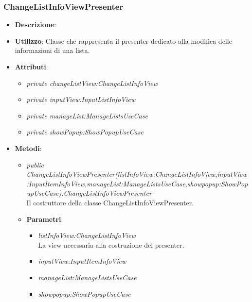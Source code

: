 \subsubsection{ChangeListInfoViewPresenter}
\begin{itemize}
\item \textbf{Descrizione}: 
\item \textbf{Utilizzo}: Classe che rappresenta il presenter dedicato alla modifica delle informazioni di una lista.
\item \textbf{Attributi}:
	\begin{itemize}
	\item \textit{private changeListView:ChangeListInfoView}\\
	
	\item \textit{private inputView:InputListInfoView}\\
	
	\item \textit{private manageList:ManageListsUseCase}\\
	
	\item \textit{private showPopup:ShowPopupUseCase}\\
	
	\end{itemize} 
\item \textbf{Metodi}:
	\begin{itemize}
	\item \textit{public ChangeListInfoViewPresenter(listInfoView:ChangeListInfoView,inputView:InputItemInfoView,manageList:ManageListsUseCase,showpopup:ShowPopupUseCase):ChangeListInfoViewPresenter}\\
Il costruttore della classe ChangeListInfoViewPresenter.
			\item{\textbf{Parametri}: \begin{itemize}
			\item \textit{listInfoView:ChangeListInfoView}\\
			La view necessaria alla costruzione del presenter.
			\item \textit{inputView:InputItemInfoView}\\

			\item \textit{manageList:ManageListsUseCase}\\

			\item \textit{showpopup:ShowPopupUseCase}\\


\end{itemize}}
\end{itemize}
\end{itemize}

